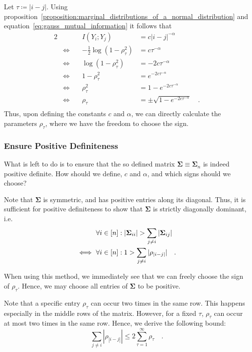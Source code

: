 \documentclass[../../main.tex]{subfiles}
\begin{document}
Let $\tau \coloneqq |i-j|$. Using proposition~\ref{proposition:marginal_distributions_of_a_normal_distribution}  and equation~\eqref{eq:gauss_mutual_information} it follows that
\begin{alignat*}{2}
    && I(Y_i; Y_j) &= c |i-j|^{-\alpha} \\
    & \iff \quad & -\frac{1}{2}\log(1-\rho_\tau^2) &= c \tau^{-\alpha} \\
    & \iff \quad & \log(1-\rho_\tau^2) &= -2c \tau^{-\alpha} \\
    & \iff \quad & 1-\rho_\tau^2 &= e^{-2c \tau^{-\alpha}} \\
    & \iff \quad & \rho_\tau^2 &= 1 - e^{-2c \tau^{-\alpha}} \\
    & \iff \quad & \rho_\tau &= \pm \sqrt{1 - e^{-2c \tau^{-\alpha}}} \quad . \\
\end{alignat*}
Thus, upon defining the constants $c$ and $\alpha$, we can directly calculate the parameters $\rho_\tau$, where we have the freedom to choose the sign.

\subsubsection{Ensure Positive Definiteness}
What is left to do is to ensure that the so defined matrix $\bm{\Sigma} \equiv \bm{\Sigma}_n$ is indeed positive definite. How should we define, $c$ and $\alpha$, and which signs should we choose?

Note that $\bm{\Sigma}$ is symmetric, and has positive entries along its diagonal. Thus, it is sufficient for positive definiteness to show that $\bm{\Sigma}$ is strictly diagonally dominant, i.e.
\begin{align}
    &\forall i \in [n]: |\bm{\Sigma}_{ii}| > \sum_{j \neq i} |\bm{\Sigma}_{ij}| \notag \\
    \iff \ &\forall i \in [n]: 1 > \sum_{j \neq i} |\rho_{|i-j|}| \quad . \label{eq:diagonal_dominant}
\end{align}

When using this method, we immediately see that we can freely choose the sign of $\rho_\tau$. Hence, we may choose all entries of $\bm{\Sigma}$ to be positive.

Note that a specific entry $\rho_\tau$ can occur two times in the same row. This happens especially in the middle rows of the matrix. However, for a fixed $\tau$, $\rho_\tau$ can occur at most two times in the same row. Hence, we derive the following bound:
\begin{equation}
    \sum_{j \neq i} |\rho_{|i-j|}| \leq 2 \sum_{\tau = 1}^{\infty} \rho_\tau \quad . \label{eq:diagonal_dominant_sufficient}
\end{equation}
\end{document}
